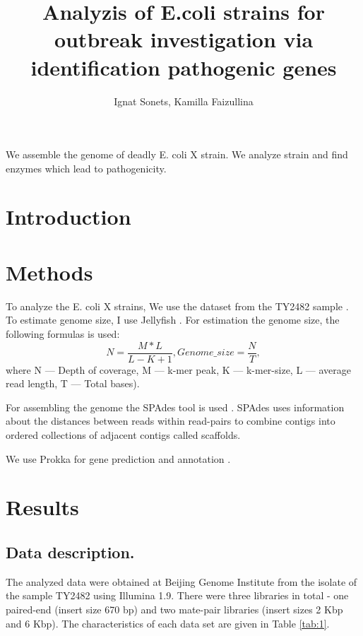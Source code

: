 \documentclass{article}
\title{ Analyzis of E.coli strains for outbreak investigation via identification pathogenic genes    }
\author{ Ignat Sonets, Kamilla Faizullina}
\date{\empty}
\begin{document}
\maketitle
We assemble the genome of deadly E. coli X strain. We analyze strain and find enzymes which lead to pathogenicity.
 
 
\section{Introduction}
\section{Methods}
To analyze the E. coli X strains, We use the dataset from the TY2482 sample \cite{data}. To estimate genome size, I use Jellyfish \cite{jellyfish}. For estimation the genome size, the following formulas is used: 
$$ N = \frac{M*L}{L-K+1}, Genome\_size = \frac{N}{T}, $$
where N --- Depth of coverage, M --- k-mer peak, K --- k-mer-size, L --- average read length, T --- Total bases).

For assembling the genome the SPAdes tool is used \cite {spades}. SPAdes uses information about the distances between reads within read-pairs to combine contigs into ordered collections of adjacent contigs called scaffolds. 

We use Prokka  for gene prediction and annotation \cite{prokka}.


\section{Results}

\subsection{Data description.}
The analyzed data were obtained at Beijing Genome Institute from the isolate of the sample TY2482 using Illumina 1.9. There were three libraries in total - one paired-end (insert size 670 bp) and two mate-pair libraries (insert sizes 2 Kbp and 6 Kbp). The characteristics of each data set are given in Table \ref{tab:1}.
\end{document}
